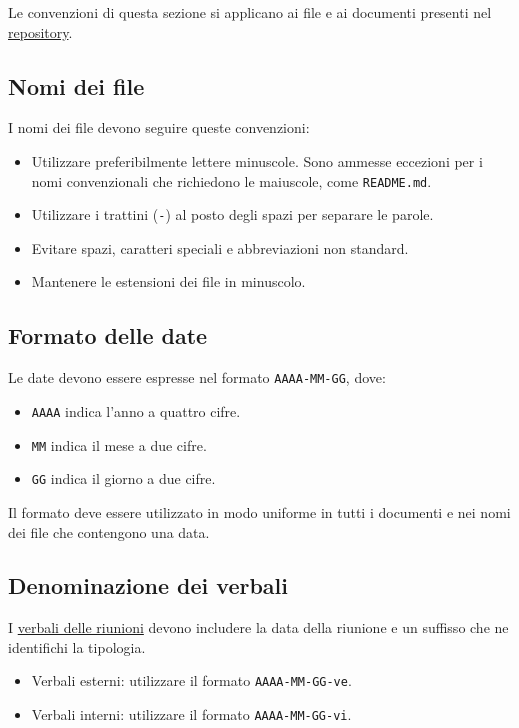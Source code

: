 \documentclass[11pt, a4paper]{article}
\begin{document}
Le convenzioni di questa sezione si applicano ai file e ai documenti presenti nel \href{https://github.com/On-By-One-Team/On-By-One.github.io}{repository}.

\subsection{Nomi dei file}

I nomi dei file devono seguire queste convenzioni:
\begin{itemize}
    \item Utilizzare preferibilmente lettere minuscole. Sono ammesse eccezioni per i nomi convenzionali che richiedono le maiuscole, come \texttt{README.md}.
    \item Utilizzare i trattini (\texttt{-}) al posto degli spazi per separare le parole.
    \item Evitare spazi, caratteri speciali e abbreviazioni non standard.
    \item Mantenere le estensioni dei file in minuscolo.
\end{itemize}

\subsection{Formato delle date}

Le date devono essere espresse nel formato \texttt{AAAA-MM-GG}, dove:
\begin{itemize}
    \item \texttt{AAAA} indica l'anno a quattro cifre.
    \item \texttt{MM} indica il mese a due cifre.
    \item \texttt{GG} indica il giorno a due cifre.
\end{itemize}

\noindent Il formato deve essere utilizzato in modo uniforme in tutti i documenti e nei nomi dei file che contengono una data.

\subsection{Denominazione dei verbali}

I \href{https://github.com/On-By-One-Team/On-By-One.github.io/tree/main/docs/pdf/verbali}{verbali delle riunioni} devono includere la data della riunione e un suffisso che ne identifichi la tipologia.
\begin{itemize}
    \item Verbali esterni: utilizzare il formato \texttt{AAAA-MM-GG-ve}.
    \item Verbali interni: utilizzare il formato \texttt{AAAA-MM-GG-vi}.
\end{itemize}
\end{document}
